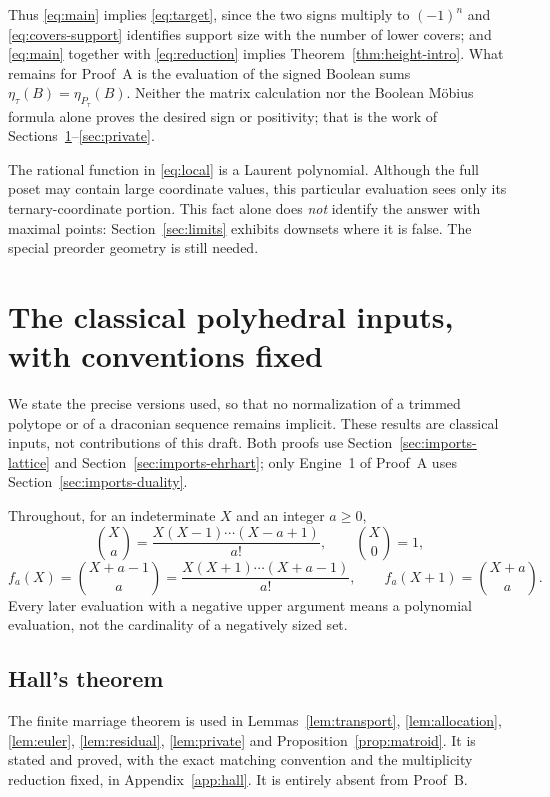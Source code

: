 \documentclass[11pt]{article}
\numberwithin{equation}{section}
\theoremstyle{definition}
\theoremstyle{remark}
\begin{document}
Thus \eqref{eq:main} implies \eqref{eq:target}, since the two signs multiply
to $(-1)^n$ and \eqref{eq:covers-support} identifies support size with the
number of lower covers; and \eqref{eq:main} together with \eqref{eq:reduction}
implies Theorem~\ref{thm:height-intro}. What remains for Proof~A is the
evaluation of the signed Boolean sums $\eta_\tau(B)=\eta_{P_\tau}(B)$. Neither
the matrix calculation nor the Boolean M\"obius formula alone proves the
desired sign or positivity; that is the work of
Sections~\ref{sec:imports}--\ref{sec:private}.

The rational function in \eqref{eq:local} is a Laurent polynomial. Although
the full poset may contain large coordinate values, this particular evaluation
sees only its ternary-coordinate portion. This fact alone does \emph{not}
identify the answer with maximal points: Section~\ref{sec:limits} exhibits
downsets where it is false. The special preorder geometry is still needed.

\section{The classical polyhedral inputs, with conventions fixed}
\label{sec:imports}

We state the precise versions used, so that no normalization of a trimmed
polytope or of a draconian sequence remains implicit. These results are
classical inputs, not contributions of this draft. Both proofs use
Section~\ref{sec:imports-lattice} and Section~\ref{sec:imports-ehrhart};
only Engine~1 of Proof~A uses Section~\ref{sec:imports-duality}.

Throughout, for an indeterminate $X$ and an integer $a\ge0$,
\begin{equation}
 \binom Xa=\frac{X(X-1)\cdots(X-a+1)}{a!},\qquad\binom X0=1,
\end{equation}
\begin{equation}
 f_a(X)=\binom{X+a-1}{a}=\frac{X(X+1)\cdots(X+a-1)}{a!},
 \qquad f_a(X+1)=\binom{X+a}{a}.
 \label{eq:binomial-polynomial}
\end{equation}
Every later evaluation with a negative upper argument means a polynomial
evaluation, not the cardinality of a negatively sized set.

\subsection{Hall's theorem}
The finite marriage theorem \cite{Hall} is used in
Lemmas~\ref{lem:transport}, \ref{lem:allocation}, \ref{lem:euler},
\ref{lem:residual}, \ref{lem:private} and Proposition~\ref{prop:matroid}. It
is stated and proved, with the exact matching convention and the multiplicity
reduction fixed, in Appendix~\ref{app:hall}. It is entirely absent from
Proof~B.
\end{document}
